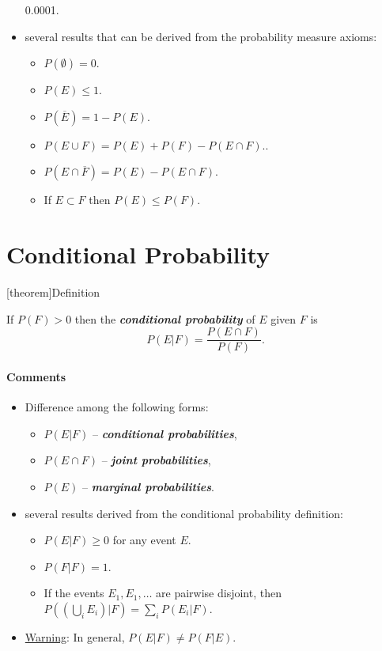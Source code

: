 \documentclass[12pt]{report}
\theoremstyle{definition}
\begin{document}
\begin{itemize}
\begin{probability-interpretations}
\begin{enumerate}
                    0.0001.
            \end{enumerate} 
        \end{probability-interpretations}
    \item several results that can be derived from the probability measure
        axioms:
        \begin{itemize}
            \item $P(\emptyset)=0$.
            \item $P(E)\le 1$.
            \item $P(\overline{E})=1-P(E)$.
            \item $P(E\cup F)=P(E)+P(F)-P(E\cap F)$..
            \item $P(E\cap \overline{F})=P(E)-P(E\cap F)$.
            \item If $E\subset F$ then $P(E)\le P(F)$.
        \end{itemize} 
\end{itemize} 

\section{Conditional Probability}

[theorem]{Definition}
\begin{conditional probability}
    If $P(F)>0$ then the \textbf{\emph{conditional probability}} of $E$ given
    $F$ is
    \[
        P(E|F)=\frac{P(E\cap F)}{P(F)}.
    \]
\end{conditional probability}
\paragraph{Comments}
\begin{itemize}
    \item Difference among the following forms:
        \begin{itemize}
            \item $P(E|F)$ -- \textbf{\emph{conditional probabilities}},
            \item $P(E\cap F)$ -- \textbf{\emph{joint probabilities}},
            \item $P(E)$ -- \textbf{\emph{marginal probabilities}}.
        \end{itemize} 
    \item several results derived from the conditional probability definition:
        \begin{itemize}
            \item $P(E|F)\ge 0$ for any event $E$.
            \item $P(F|F)=1$.
            \item If the events $E_1,E_1,\ldots$ are pairwise disjoint, then
                $P\left(\left(\bigcup_i E_i\right)|F\right)=\sum_{i} P(E_i|F)$.
        \end{itemize} 
    \item \underline{Warning}: In general, $P(E|F)\neq P(F|E)$.
\end{itemize} 
\end{document}
